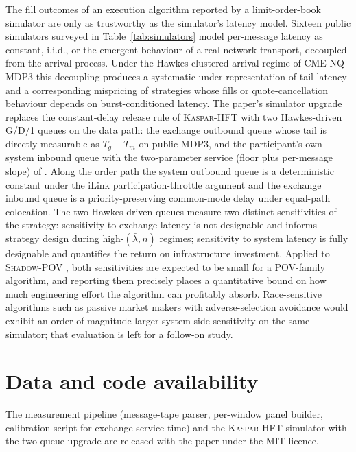\documentclass[11pt]{article}
\newcommand{\kasparhft}{\textsc{Kaspar-HFT}}
\newcommand{\shadowpov}{\textsc{Shadow-POV}}
\begin{document}
The fill outcomes of an execution algorithm reported by a limit-order-book simulator are only as trustworthy as the simulator's latency model. Sixteen public simulators surveyed in Table~\ref{tab:simulators} model per-message latency as constant, i.i.d., or the emergent behaviour of a real network transport, decoupled from the arrival process. Under the Hawkes-clustered arrival regime of CME NQ MDP3 this decoupling produces a systematic under-representation of tail latency and a corresponding mispricing of strategies whose fills or quote-cancellation behaviour depends on burst-conditioned latency. The paper's simulator upgrade replaces the constant-delay release rule of \kasparhft{} with two Hawkes-driven G/D/1 queues on the data path: the exchange outbound queue whose tail is directly measurable as $T_g - T_m$ on public MDP3, and the participant's own system inbound queue with the two-parameter service (floor plus per-message slope) of \citet{mayeski_actorhft}. Along the order path the system outbound queue is a deterministic constant under the iLink participation-throttle argument and the exchange inbound queue is a priority-preserving common-mode delay under equal-path colocation. The two Hawkes-driven queues measure two distinct sensitivities of the strategy: sensitivity to exchange latency is not designable and informs strategy design during high-$(\bar\lambda, n)$ regimes; sensitivity to system latency is fully designable and quantifies the return on infrastructure investment. Applied to \shadowpov{} \citep{mayeski2026shadowpov}, both sensitivities are expected to be small for a POV-family algorithm, and reporting them precisely places a quantitative bound on how much engineering effort the algorithm can profitably absorb. Race-sensitive algorithms such as passive market makers with adverse-selection avoidance would exhibit an order-of-magnitude larger system-side sensitivity on the same simulator; that evaluation is left for a follow-on study.

\section*{Data and code availability}

The measurement pipeline (message-tape parser, per-window panel builder, calibration script for exchange service time) and the \kasparhft{} simulator with the two-queue upgrade are released with the paper under the MIT licence.

\appendix


\end{document}
